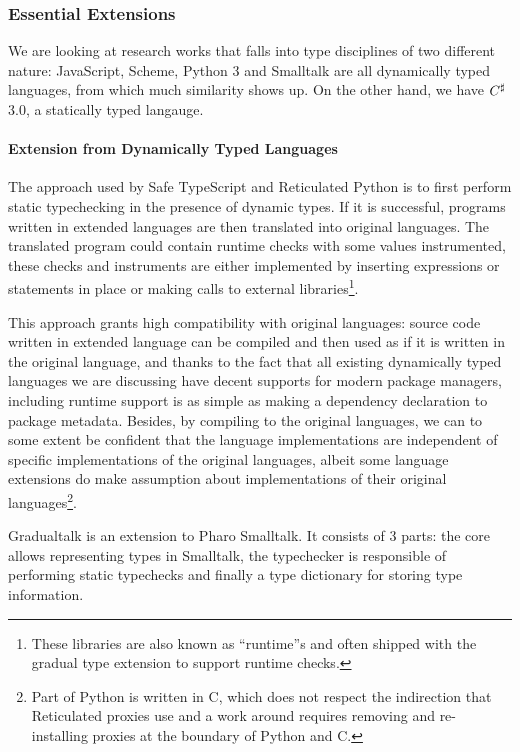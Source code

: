 \subsubsection{Essential Extensions}

We are looking at research works that falls into type disciplines of two different nature:
JavaScript, Scheme, Python 3 and Smalltalk are all dynamically typed languages, from which
much similarity shows up.
On the other hand, we have $C^\sharp$ 3.0, a statically
typed langauge.

\paragraph{Extension from Dynamically Typed Languages}

The approach used by Safe TypeScript and Reticulated Python
is to first perform static typechecking in the presence of dynamic types.
If it is successful, programs written in extended languages are then translated into original languages.
The translated program could contain runtime checks with some values instrumented,
these checks and instruments are either implemented by inserting expressions or statements in place or
making calls to external libraries\footnote{
	These libraries are also known as ``runtime''s
	and often shipped
	with the gradual type extension to support
	runtime checks.
}.

This approach grants high compatibility with original languages: source code written in extended language
can be compiled and then used as if it is written in the original language, and thanks to the fact
that all existing dynamically typed languages
we are discussing have decent supports for modern package managers,
including runtime support is as simple as making a dependency declaration to package metadata.
Besides, by compiling to the original languages,
we can to some extent be confident that the language implementations
are independent of specific implementations of the original languages,
albeit some language extensions do make assumption about implementations of their original languages\footnote{
	Part of Python is written in C, which does not respect the indirection that
	Reticulated proxies use and a work around requires removing and re-installing
	proxies at the boundary of Python and C\cite{vitousek2014design}. 
}.


Gradualtalk is an extension to Pharo Smalltalk. It consists of 3 parts:
the core allows representing types in Smalltalk, the typechecker
is responsible of performing static typechecks and finally
a type dictionary for storing type information.

